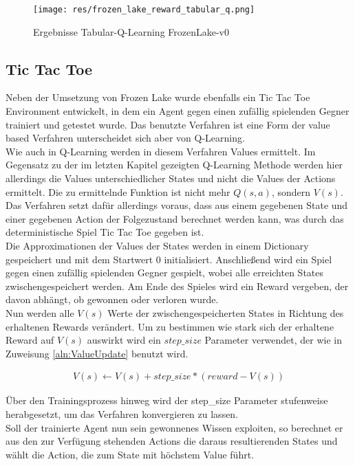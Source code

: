 \documentclass[11pt]{scrartcl}
\begin{document}
\begin{figure}[htp]
\centering
\texttt{[image: res/frozen\_lake\_reward\_tabular\_q.png]}
\caption{Ergebnisse Tabular-Q-Learning FrozenLake-v0}
\label{fig:frozen-lake_q_learning}
\end{figure}


\subsection{Tic Tac Toe}
Neben der Umsetzung von Frozen Lake wurde ebenfalls ein Tic Tac Toe Environment
entwickelt, in dem ein Agent gegen einen zufällig spielenden Gegner trainiert und getestet
wurde. Das benutzte Verfahren ist eine Form der value based Verfahren unterscheidet sich
aber von Q-Learning.\\
Wie auch in Q-Learning werden in diesem Verfahren Values ermittelt. Im Gegensatz zu der im
letzten Kapitel gezeigten Q-Learning Methode werden hier allerdings die Values
unterschiedlicher States und nicht die Values der Actions ermittelt. Die zu ermittelnde
Funktion ist nicht mehr $Q(s, a)$, sondern $V(s)$. Das Verfahren setzt dafür allerdings
voraus, dass aus einem gegebenen State und einer gegebenen Action der Folgezustand
berechnet werden kann, was durch das deterministische Spiel Tic Tac Toe gegeben ist.\\
Die Approximationen der Values der States werden in einem Dictionary gespeichert und mit
dem Startwert 0 initialisiert. Anschließend wird ein Spiel gegen einen zufällig spielenden
Gegner gespielt, wobei alle erreichten States zwischengespeichert werden. Am Ende des
Spieles wird ein Reward vergeben, der davon abhängt, ob gewonnen oder verloren wurde.\\
Nun werden alle $V(s)$ Werte der zwischengespeicherten States in Richtung des erhaltenen
Rewards verändert. Um zu bestimmen wie stark sich der erhaltene Reward auf $V(s)$ auswirkt
wird ein $step\_size$ Parameter verwendet, der wie in Zuweisung \ref{aln:ValueUpdate} benutzt wird.

\begin{align}
  V(s) \leftarrow V(s) + step\_size * (reward - V(s))
  \label{aln:ValueUpdate}
\end{align}

\noindent
Über den Trainingsprozess hinweg wird der step\_size Parameter stufenweise herabgesetzt,
um das Verfahren konvergieren zu lassen.\\
Soll der trainierte Agent nun sein gewonnenes Wissen exploiten, so berechnet er aus den
zur Verfügung stehenden Actions die daraus resultierenden States und wählt die Action, die
zum State mit höchstem Value führt.
\end{document}
